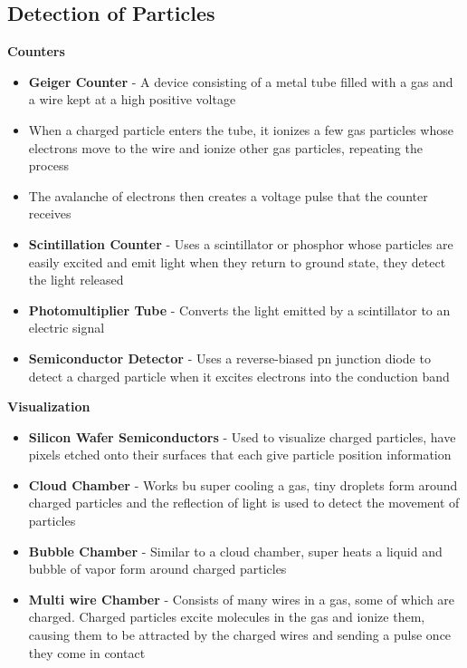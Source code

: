 \subsection{Detection of Particles}
\textbf{Counters}
\begin{itemize}
    \item \textbf{Geiger Counter} - A device consisting of a metal tube filled with a gas and a wire kept at a high positive voltage
    \item When a charged particle enters the tube, it ionizes a few gas particles whose electrons move to the wire and ionize other gas particles, repeating the process
    \item The avalanche of electrons then creates a voltage pulse that the counter receives 
    \item \textbf{Scintillation Counter} - Uses a scintillator or phosphor whose particles are easily excited and emit light when they return to ground state, they detect the light released
    \item \textbf{Photomultiplier Tube} - Converts the light emitted by a scintillator to an electric signal
    \item \textbf{Semiconductor Detector} - Uses a reverse-biased pn junction diode to detect a charged particle when it excites electrons into the conduction band
\end{itemize}

\textbf{Visualization}
\begin{itemize}
    \item \textbf{Silicon Wafer Semiconductors} - Used to visualize charged particles, have pixels etched onto their surfaces that each give particle position information
    \item \textbf{Cloud Chamber} - Works bu super cooling a gas, tiny droplets form around charged particles and the reflection of light is used to detect the movement of particles
    \item \textbf{Bubble Chamber} - Similar to a cloud chamber, super heats a liquid and bubble of vapor form around charged particles
    \item \textbf{Multi wire Chamber} - Consists of many wires in a gas, some of which are charged. Charged particles excite molecules in the gas and ionize them, causing them to be attracted by the charged wires and sending a pulse once they come in contact
\end{itemize}

\newpage